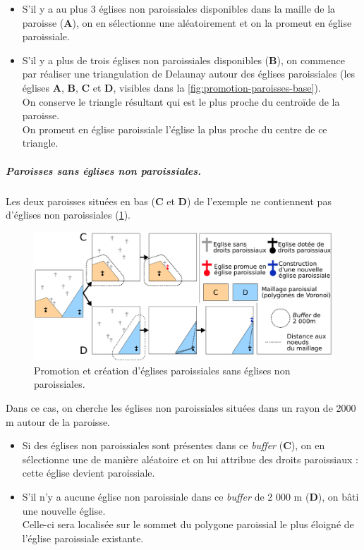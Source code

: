 \begin{itemize}
	\item S'il y a au plus 3 églises non paroissiales disponibles dans la maille de la paroisse (\textbf{A}), on en sélectionne une aléatoirement et on la promeut en église paroissiale.
	
	\item S'il y a plus de trois églises non paroissiales disponibles (\textbf{B}), on commence par réaliser une triangulation de Delaunay autour des églises paroissiales (les églises \textbf{A}, \textbf{B}, \textbf{C} et \textbf{D}, visibles dans la \cref{fig:promotion-paroisses-base}).\\
	On conserve le triangle résultant qui est le plus proche du centroïde de la paroisse.\\
	On promeut en église paroissiale l'église la plus proche du centre de ce triangle.	
\end{itemize}


\subparagraph{Paroisses sans églises non paroissiales.}

Les deux paroisses situées en bas (\textbf{C} et \textbf{D}) de l'exemple ne contiennent pas d'églises non paroissiales (\cref{fig:promotion-paroisses-2}).

\begin{figure}[H]
	\centering
	\includegraphics[width=1\linewidth]{img/promo_creation_paroisses_promo2.pdf}
	\caption{Promotion et création d'églises paroissiales sans églises non paroissiales.}
	\label{fig:promotion-paroisses-2}
\end{figure}

Dans ce cas, on cherche les églises non paroissiales situées dans un rayon de 2000 m autour de la paroisse.
\begin{itemize}
	\item Si des églises non paroissiales sont présentes dans ce \textit{buffer} (\textbf{C}), on en sélectionne une de manière aléatoire et on lui attribue des droits paroissiaux : cette église devient paroissiale.
	
	\item S'il n'y a aucune église non paroissiale dans ce \textit{buffer} de 2 000 m (\textbf{D}), on bâti une nouvelle église.\\
	Celle-ci sera localisée sur le sommet du polygone paroissial le plus éloigné de l'église paroissiale existante.
\end{itemize}

